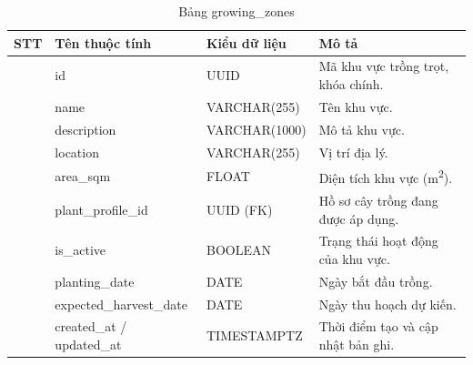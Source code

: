 \documentclass[13pt,a4paper]{extarticle}
\numberwithin{figure}{section}
\numberwithin{table}{section}
\begin{document}
	\begin{table}[H]
		\centering
		\caption{Bảng growing\_zones}
		\label{tab:growing_zones}
		\begingroup
		\setlength{\tabcolsep}{3pt}
		\begin{tabularx}{\textwidth}{|>{\centering\arraybackslash}p{1cm}|>{\raggedright\arraybackslash}p{3.8cm}|>{\raggedright\arraybackslash}p{3.2cm}|Y|}
			\hline
			\centering\textbf{STT} & \centering\textbf{Tên thuộc tính} & \centering\textbf{Kiểu dữ liệu} & \centering\arraybackslash\textbf{Mô tả} \\
			 & id & UUID & Mã khu vực trồng trọt, khóa chính. \\
			 & name & VARCHAR(255) & Tên khu vực. \\
			 & description & VARCHAR(1000) & Mô tả khu vực. \\
			 & location & VARCHAR(255) & Vị trí địa lý. \\
			 & area\_sqm & FLOAT & Diện tích khu vực (m\textsuperscript{2}). \\
			 & plant\_profile\_id & UUID (FK) & Hồ sơ cây trồng đang được áp dụng. \\
			 & is\_active & BOOLEAN & Trạng thái hoạt động của khu vực. \\
			 & planting\_date & DATE & Ngày bắt đầu trồng. \\
			 & expected\_harvest\_date & DATE & Ngày thu hoạch dự kiến. \\
			 & created\_at / updated\_at & TIMESTAMPTZ & Thời điểm tạo và cập nhật bản ghi. \\
			\hline
		\end{tabularx}
		\endgroup
	\end{table}
	
\end{document}
